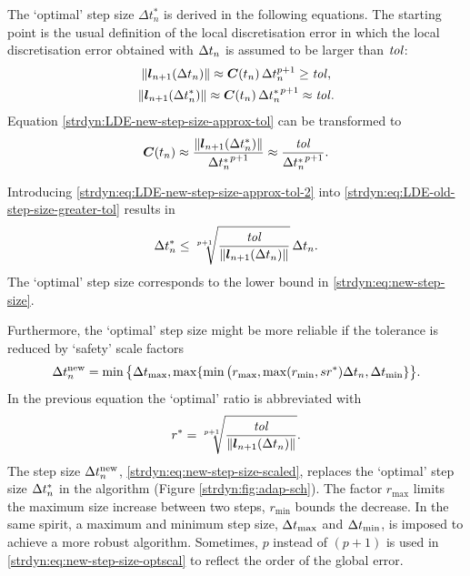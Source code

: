 The `optimal' step size
$\Delta t_n^*$ is derived in the following equations. The starting point is
the usual definition of the local discretisation error in which the local discretisation error obtained with $\Delta t_n$ is
assumed to be larger than $\mathit{tol}$:
\begin{gather}
  \label{strdyn:eq:LDE-old-step-size-greater-tol}
  \| \boldsymbol{l}_{n+1}(\Delta t_n) \|
  \approx \boldsymbol{C}(t_n)\, \Delta t_n^{p+1} 
  \geq \mathit{tol}
  \text{,}
\\
  \label{strdyn:eq:LDE-new-step-size-approx-tol}
  \| \boldsymbol{l}_{n+1}(\Delta t_n^*) \|
  \approx \boldsymbol{C}(t_n)\, {\Delta t_n^*}^{p+1} 
  \approx \mathit{tol}
  \text{.}
\end{gather}
Equation \eqref{strdyn:LDE-new-step-size-approx-tol} can be transformed to
\begin{equation} \label{strdyn:eq:LDE-new-step-size-approx-tol-2}
  \boldsymbol{C}(t_n)
  \approx \frac{\| \boldsymbol{l}_{n+1}(\Delta t_n^*) \|}{{\Delta
  t_n^*}^{p+1}}
  \approx \frac{\mathit{tol}}{{\Delta t_n^*}^{p+1}}
  \text{.}
\end{equation}

Introducing \eqref{strdyn:eq:LDE-new-step-size-approx-tol-2} into
\eqref{strdyn:eq:LDE-old-step-size-greater-tol} results in
\begin{equation}\label{strdyn:eq:new-step-size}
  \Delta t_n^* \leq \sqrt[{p+1}]{\frac{\mathit{tol}}{\|
  \boldsymbol{l}_{n+1}(\Delta t_n) \|}}\, \Delta t_n
  \text{.}
\end{equation}
The `optimal' step size corresponds to the lower bound in
\eqref{strdyn:eq:new-step-size}\@. 

Furthermore, the `optimal' step size might be more reliable if the
tolerance is reduced by `safety' scale factors
\begin{equation}\label{strdyn:eq:new-step-size-scaled}
  \Delta t_n^\text{new}
  = \min\big\{ \Delta t_\text{max}, \max\{\min\big( r_\text{max}, \max(
  r_\text{min}, s r^*)\Delta t_n, \Delta t_\text{min} \} \big\}
  \text{.}
\end{equation}
In the previous equation the `optimal' ratio is abbreviated with
\begin{equation}\label{strdyn:eq:new-step-size-optscal}
  r^* = \sqrt[{p+1}]{\frac{\mathit{tol}}{\|
  \boldsymbol{l}_{n+1}(\Delta t_n) \|}}
  \text{.}
\end{equation}
The step size $\Delta t_n^\text{new}$,  \eqref{strdyn:eq:new-step-size-scaled},
replaces the `optimal' step size $\Delta t_n^*$ in 
the algorithm (Figure \ref{strdyn:fig:adap-sch})\@. The factor $r_\text{max}$
limits the maximum size increase between two steps, $r_\text{min}$ bounds the
decrease. 
In the same spirit, a
maximum and minimum step size, $\Delta t_\text{max}$ and $\Delta t_\text{min}$, is
imposed to achieve a more robust algorithm. Sometimes, $p$ instead of $(p+1)$
is 
used in \eqref{strdyn:eq:new-step-size-optscal} to reflect the order of the
global error. 
\newline

